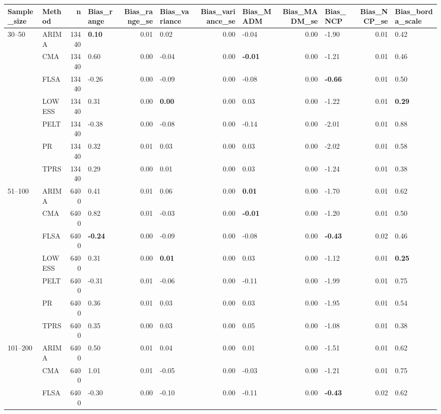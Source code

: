 \begin{table}[ht]
\centering
\begin{tabular}{llrlrlrlrlrl}
  \toprule
Sample_size & Method & n & Bias_range & Bias_range_se & Bias_variance & Bias_variance_se & Bias_MADM & Bias_MADM_se & Bias_NCP & Bias_NCP_se & Bias_borda_scale \\ 
  \midrule
30–50 & ARIMA & 13440 & \textbf{0.10} & 0.01 & 0.02 & 0.00 & -0.04 & 0.00 & -1.90 & 0.01 & 0.42 \\ 
   & CMA & 13440 & 0.60 & 0.00 & -0.04 & 0.00 & \textbf{-0.01} & 0.00 & -1.21 & 0.01 & 0.46 \\ 
   & FLSA & 13440 & -0.26 & 0.00 & -0.09 & 0.00 & -0.08 & 0.00 & \textbf{-0.66} & 0.01 & 0.50 \\ 
   & LOWESS & 13440 & 0.31 & 0.00 & \textbf{0.00} & 0.00 & 0.03 & 0.00 & -1.22 & 0.01 & \textbf{0.29} \\ 
   & PELT & 13440 & -0.38 & 0.00 & -0.08 & 0.00 & -0.14 & 0.00 & -2.01 & 0.01 & 0.88 \\ 
   & PR & 13440 & 0.32 & 0.01 & 0.03 & 0.00 & 0.03 & 0.00 & -2.02 & 0.01 & 0.58 \\ 
   & TPRS & 13440 & 0.29 & 0.00 & 0.01 & 0.00 & 0.03 & 0.00 & -1.24 & 0.01 & 0.38 \\ 
  51–100 & ARIMA & 6400 & 0.41 & 0.01 & 0.06 & 0.00 & \textbf{0.01} & 0.00 & -1.70 & 0.01 & 0.62 \\ 
   & CMA & 6400 & 0.82 & 0.01 & -0.03 & 0.00 & \textbf{-0.01} & 0.00 & -1.20 & 0.01 & 0.50 \\ 
   & FLSA & 6400 & \textbf{-0.24} & 0.00 & -0.09 & 0.00 & -0.08 & 0.00 & \textbf{-0.43} & 0.02 & 0.46 \\ 
   & LOWESS & 6400 & 0.31 & 0.00 & \textbf{0.01} & 0.00 & 0.03 & 0.00 & -1.12 & 0.01 & \textbf{0.25} \\ 
   & PELT & 6400 & -0.31 & 0.01 & -0.06 & 0.00 & -0.11 & 0.00 & -1.99 & 0.01 & 0.75 \\ 
   & PR & 6400 & 0.36 & 0.01 & 0.03 & 0.00 & 0.03 & 0.00 & -1.95 & 0.01 & 0.54 \\ 
   & TPRS & 6400 & 0.35 & 0.00 & 0.03 & 0.00 & 0.05 & 0.00 & -1.08 & 0.01 & 0.38 \\ 
  101–200 & ARIMA & 6400 & 0.50 & 0.01 & 0.04 & 0.00 & 0.01 & 0.00 & -1.51 & 0.01 & 0.62 \\ 
   & CMA & 6400 & 1.01 & 0.01 & -0.05 & 0.00 & -0.03 & 0.00 & -1.21 & 0.01 & 0.75 \\ 
   & FLSA & 6400 & -0.30 & 0.00 & -0.10 & 0.00 & -0.11 & 0.00 & \textbf{-0.43} & 0.02 & 0.62 \\ 

\end{tabular}
\end{table}
